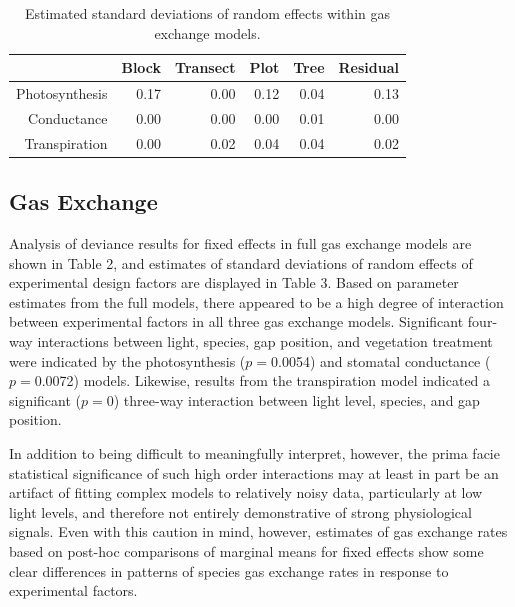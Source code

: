 \documentclass{article}\usepackage[]{graphicx}\usepackage[]{color}
\begin{document}
\begin{table}[ht]
\centering
\begin{tabular}{rrrrrr}
  \hline
 & Block & Transect & Plot & Tree & Residual \\ 
  \hline
Photosynthesis & 0.17 & 0.00 & 0.12 & 0.04 & 0.13 \\ 
  Conductance & 0.00 & 0.00 & 0.00 & 0.01 & 0.00 \\ 
  Transpiration & 0.00 & 0.02 & 0.04 & 0.04 & 0.02 \\ 
   \hline
\end{tabular}
\caption{Estimated standard deviations of random effects within gas exchange models.} 
\end{table}


\begin{multicols}{2}

\subsection{Gas Exchange}
Analysis of deviance results for fixed effects in full gas exchange models are shown in Table 2, and estimates of standard deviations of random effects of experimental design factors are displayed in Table 3. Based on parameter estimates from the full models, there appeared to be a high degree of interaction between experimental factors in all three gas exchange models. Significant four-way interactions between light, species, gap position, and vegetation treatment were indicated by the photosynthesis ($p=$0.0054) and stomatal conductance ($p=$0.0072) models. Likewise, results from the transpiration model indicated a significant ($p=$0) three-way interaction between light level, species, and gap position. 

In addition to being difficult to meaningfully interpret, however, the prima facie statistical significance of such high order interactions may at least in part be an artifact of fitting complex models to relatively noisy data, particularly at low light levels, and therefore not entirely demonstrative of strong physiological signals. Even with this caution in mind, however, estimates of gas exchange rates based on post-hoc comparisons of marginal means for fixed effects show some clear differences in patterns of species gas exchange rates in response to experimental factors. 

\end{multicols}
\end{document}
